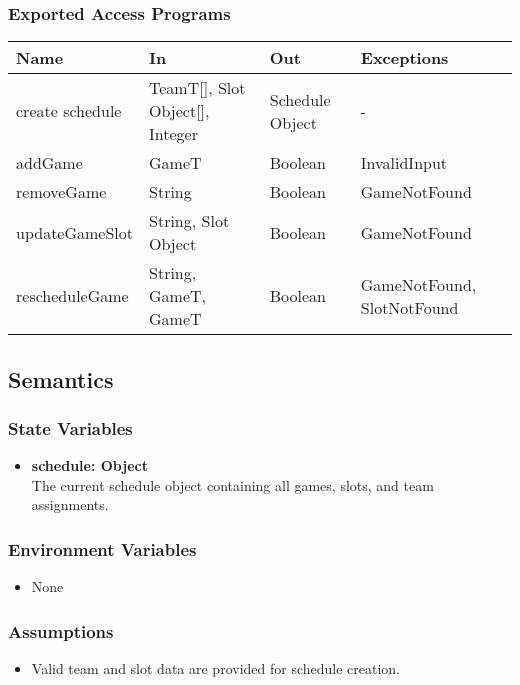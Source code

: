 \documentclass[12pt, titlepage]{article}
\begin{document}
\begin{itemize}
\subsubsection{Exported Access Programs}
\begin{center}
  \begin{tabular}{|p{4cm}| p{4cm}| p{4cm} | p{3cm}|}
  \hline
  \textbf{Name} & \textbf{In} & \textbf{Out} & \textbf{Exceptions} \\
  \hline
  create schedule & TeamT[], Slot Object[], Integer & Schedule Object & - \\
  addGame & GameT & Boolean & InvalidInput \\
  removeGame & String & Boolean & GameNotFound \\
  updateGameSlot & String, Slot Object & Boolean & GameNotFound \\
  rescheduleGame & String, GameT, GameT & Boolean & GameNotFound, SlotNotFound \\
  \hline
  \end{tabular}
\end{center}

\subsection{Semantics}

\subsubsection{State Variables}
\begin{itemize}
    \item \textbf{schedule: Object} \\ The current schedule object containing all games, slots, and team assignments.
\end{itemize}

\subsubsection{Environment Variables}
\begin{itemize}
    \item None
\end{itemize}

\subsubsection{Assumptions}
\begin{itemize}
    \item Valid team and slot data are provided for schedule creation.
\end{itemize}


\end{itemize}
\end{document}
